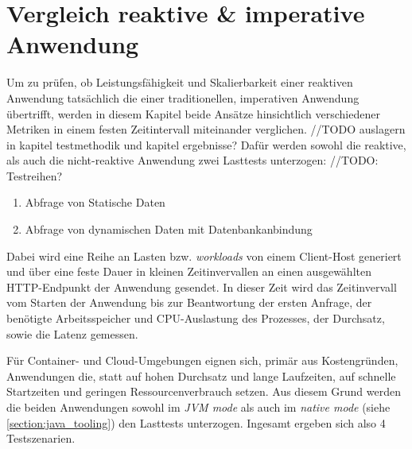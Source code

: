\section {Vergleich reaktive \& imperative Anwendung}
\label{section:vergleich_reaktiv_imperativ}
Um zu prüfen, ob Leistungsfähigkeit und Skalierbarkeit einer reaktiven Anwendung tatsächlich die einer traditionellen, imperativen Anwendung
übertrifft, werden in diesem Kapitel beide Ansätze hinsichtlich verschiedener Metriken in einem festen Zeitintervall miteinander verglichen.
//TODO auslagern in kapitel testmethodik und kapitel ergebnisse?
Dafür werden sowohl die reaktive, als auch die nicht-reaktive Anwendung zwei Lasttests unterzogen: //TODO: Testreihen?
\begin{enumerate}
	\item Abfrage von Statische Daten
	\item Abfrage von dynamischen Daten mit Datenbankanbindung
\end{enumerate}
Dabei wird eine Reihe an Lasten bzw. \textit{workloads} von einem Client-Host generiert und über eine feste Dauer in kleinen Zeitinvervallen
an einen ausgewählten HTTP-Endpunkt der Anwendung gesendet.
In dieser Zeit wird das Zeitinvervall vom Starten der Anwendung bis zur Beantwortung der ersten Anfrage,
der benötigte Arbeitsspeicher und CPU-Auslastung des Prozesses, der Durchsatz, sowie die Latenz gemessen.

Für Container- und Cloud-Umgebungen eignen sich, primär aus Kostengründen, Anwendungen die, statt auf hohen Durchsatz und lange Laufzeiten, auf
schnelle Startzeiten und geringen Ressourcenverbrauch setzen.
Aus diesem Grund werden die beiden Anwendungen sowohl im \textit{JVM mode} als auch im \textit{native mode}
(siehe \ref{section:java_tooling}) den Lasttests unterzogen. Ingesamt ergeben sich also 4 Testszenarien.


